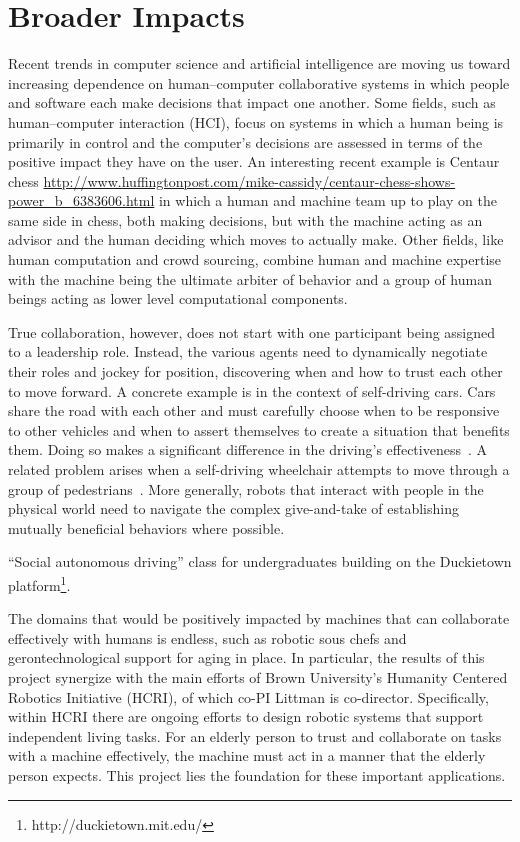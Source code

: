 
\section{Broader Impacts}

Recent trends in computer science and artificial intelligence are
moving us toward increasing dependence on human--computer
collaborative systems in which people and software each make decisions
that impact one another. Some fields, such as human--computer
interaction (HCI), focus on systems in which a human being is
primarily in control and the computer's decisions are assessed in
terms of the positive impact they have on the user. An interesting
recent example is Centaur chess
\url{http://www.huffingtonpost.com/mike-cassidy/centaur-chess-shows-power_b_6383606.html}
in which a human and machine team up to play on the same side in
chess, both making decisions, but with the machine acting as an
advisor and the human deciding which moves to actually make. Other
fields, like human computation and crowd sourcing, combine human and
machine expertise with the machine being the ultimate arbiter of
behavior and a group of human beings acting as lower level
computational components.

True collaboration, however, does not start with one participant being
assigned to a leadership role. Instead, the various agents need to
dynamically negotiate their roles and jockey for position, discovering
when and how to trust each other to move forward. A concrete example
is in the context of self-driving cars. Cars share the road with each
other and must carefully choose when to be responsive to other
vehicles and when to assert themselves to create a situation that
benefits them. Doing so makes a significant difference in the driving's
effectiveness~\cite{cunningham2015mpdm}. A related problem arises when
a self-driving wheelchair attempts to move through a group of
pedestrians~\cite{kim2016socially}. More generally, robots that
interact with people in the physical world need to navigate the
complex give-and-take of establishing mutually beneficial behaviors
where possible.

``Social autonomous driving'' class for undergraduates building on the
Duckietown platform\footnote{http://duckietown.mit.edu/}.


The domains that would be positively impacted by machines
that can collaborate effectively with humans is endless, such as robotic sous chefs and
gerontechnological support for aging in place.
%
In particular, the results of this project synergize with the main efforts of 
Brown University's Humanity Centered Robotics Initiative (HCRI), of
which co-PI Littman is co-director. Specifically, within HCRI there
are ongoing efforts to design robotic systems that support independent
living tasks. For an elderly person to trust and collaborate on tasks with a machine effectively, the machine must act in a manner that the elderly person expects. This project lies the foundation for these important applications.

